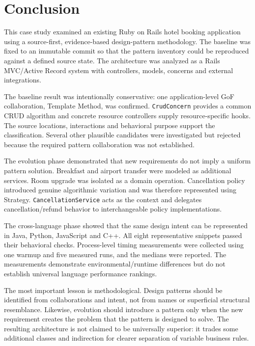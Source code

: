 \documentclass[10pt,a4paper]{article}
\newcommand{\code}[1]{\texttt{\small #1}}
\begin{document}
\section{Conclusion}

This case study examined an existing Ruby on Rails hotel booking application using a source-first, evidence-based design-pattern methodology. The baseline was fixed to an immutable commit so that the pattern inventory could be reproduced against a defined source state. The architecture was analyzed as a Rails MVC/Active Record system with controllers, models, concerns and external integrations.

The baseline result was intentionally conservative: one application-level GoF collaboration, Template Method, was confirmed. \code{CrudConcern} provides a common CRUD algorithm and concrete resource controllers supply resource-specific hooks. The source locations, interactions and behavioral purpose support the classification. Several other plausible candidates were investigated but rejected because the required pattern collaboration was not established.

The evolution phase demonstrated that new requirements do not imply a uniform pattern solution. Breakfast and airport transfer were modeled as additional services. Room upgrade was isolated as a domain operation. Cancellation policy introduced genuine algorithmic variation and was therefore represented using Strategy. \code{CancellationService} acts as the context and delegates cancellation/refund behavior to interchangeable policy implementations.

The cross-language phase showed that the same design intent can be represented in Java, Python, JavaScript and C++. All eight representative snippets passed their behavioral checks. Process-level timing measurements were collected using one warmup and five measured runs, and the medians were reported. The measurements demonstrate environmental/runtime differences but do not establish universal language performance rankings.

The most important lesson is methodological. Design patterns should be identified from collaborations and intent, not from names or superficial structural resemblance. Likewise, evolution should introduce a pattern only when the new requirement creates the problem that the pattern is designed to solve. The resulting architecture is not claimed to be universally superior: it trades some additional classes and indirection for clearer separation of variable business rules.
\end{document}
